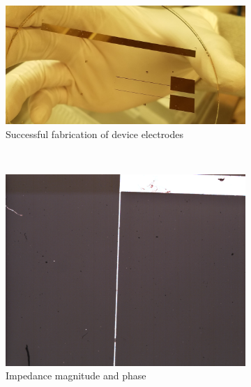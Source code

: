 \begin{figure}[h]
    \begin{subfigure}[b]{\textwidth}
        \centering
        \includegraphics[width=\textwidth]{images/electrodes_real.jpg}
        \caption{Successful fabrication of device electrodes}
    \end{subfigure}
    \\
    \vspace{0.1 in}
    \centering
    \begin{subfigure}[b]{0.45\textwidth}
        \centering
        \includegraphics[width=\textwidth]{images/electrodeFailureChunkBreak.png}
        \caption{Impedance magnitude and phase}
    \end{subfigure}
    \hfill
    \begin{subfigure}[b]{0.45\textwidth}
        \centering

\end{subfigure}
\end{figure}
